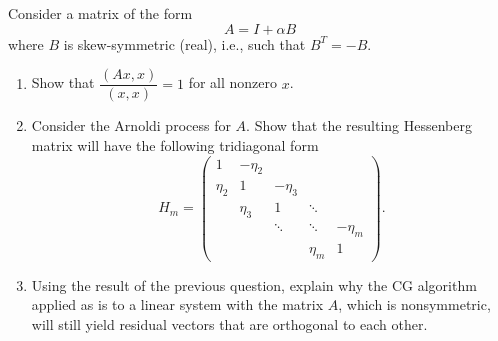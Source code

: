 \documentclass{ctexart}
\begin{document}
\begin{problem}
  Consider a matrix of the form
  \begin{equation}
    A = I + \alpha B
  \end{equation}
  where \( B \) is skew-symmetric (real), i.e., such that \( B^T = -B \).

  \begin{enumerate}
    \item Show that \( \dfrac{(A x, x)}{(x, x)} = 1 \) for all nonzero \( x \).
    \item Consider the Arnoldi process for \( A \). Show that the resulting Hessenberg matrix will have the following tridiagonal form
      \[
        H_m =
        \begin{pmatrix}
          1 & -\eta_2 &  &  &  \\
          \eta_2 & 1 & -\eta_3 &  &  \\
          & \eta_3 & 1 & \ddots &  \\
          &  & \ddots & \ddots & -\eta_m \\
          &  &  & \eta_m & 1
        \end{pmatrix}.
      \]
    \item Using the result of the previous question, explain why the CG algorithm applied as is to a linear system with the matrix \( A \), which is nonsymmetric, will still yield residual vectors that are orthogonal to each other.
  \end{enumerate}
\end{problem}
\begin{solution}
  
\end{solution}
\end{document}
